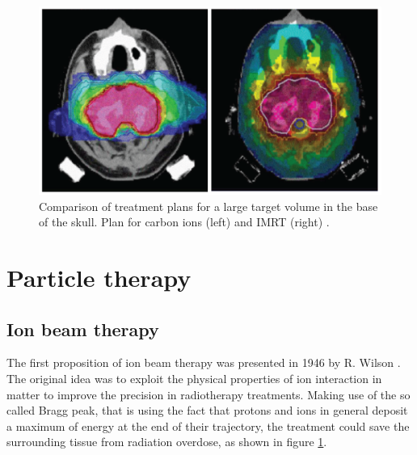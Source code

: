 \begin{figure}
\centering
\includegraphics[width=12cm]{Pictures/Chapter_1/treat_conf2.pdf}
\caption[X-ray and proton irradiation]{Comparison of treatment plans for a large target volume in the base of the skull. Plan for carbon ions (left) and IMRT (right) \cite{Durante2010}.}
\label{fig:irradiation}
\end{figure}

\section{Particle therapy}
\subsection{Ion beam therapy}

The first proposition of ion beam therapy was presented in 1946 by R. Wilson \cite{Wilson1946}. The original idea was to exploit the physical properties of ion interaction in matter to improve the precision in radiotherapy treatments.  
Making use of the so called Bragg peak, that is using the fact that protons and ions in general deposit a maximum of energy at the end of their trajectory, the treatment could save the surrounding tissue from radiation overdose, as shown in figure \ref{fig:irradiation}.

